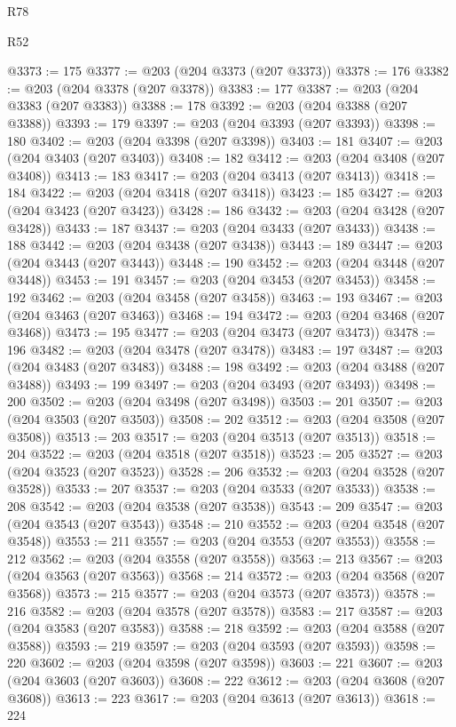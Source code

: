 \begin{lexlean}{R78}
\begin{lexlean}{R52}
\begin{coremodule}
{{{{{{{{{{{{{{{{{{{{{{{{{{{{{{{{{{{{{{{{{{{{{{{{{{{{{{{{{{{{{{{{{{{{{{{{{{{{{{{{{{{{{{{{{{{{{{{{{{{{{{{{{{{{{{{{{{{{{{{{{{{{{{{{{{{{{{{{{{{{{{{{{{{{{{{{{{{{{{{{{{{{{{{{{{{{{{{{{{{{{{{{{{{{{{{{{{{{{{@3373 := 175
@3377 := @203 (@204 @3373 (@207 @3373))
@3378 := 176
@3382 := @203 (@204 @3378 (@207 @3378))
@3383 := 177
@3387 := @203 (@204 @3383 (@207 @3383))
@3388 := 178
@3392 := @203 (@204 @3388 (@207 @3388))
@3393 := 179
@3397 := @203 (@204 @3393 (@207 @3393))
@3398 := 180
@3402 := @203 (@204 @3398 (@207 @3398))
@3403 := 181
@3407 := @203 (@204 @3403 (@207 @3403))
@3408 := 182
@3412 := @203 (@204 @3408 (@207 @3408))
@3413 := 183
@3417 := @203 (@204 @3413 (@207 @3413))
@3418 := 184
@3422 := @203 (@204 @3418 (@207 @3418))
@3423 := 185
@3427 := @203 (@204 @3423 (@207 @3423))
@3428 := 186
@3432 := @203 (@204 @3428 (@207 @3428))
@3433 := 187
@3437 := @203 (@204 @3433 (@207 @3433))
@3438 := 188
@3442 := @203 (@204 @3438 (@207 @3438))
@3443 := 189
@3447 := @203 (@204 @3443 (@207 @3443))
@3448 := 190
@3452 := @203 (@204 @3448 (@207 @3448))
@3453 := 191
@3457 := @203 (@204 @3453 (@207 @3453))
@3458 := 192
@3462 := @203 (@204 @3458 (@207 @3458))
@3463 := 193
@3467 := @203 (@204 @3463 (@207 @3463))
@3468 := 194
@3472 := @203 (@204 @3468 (@207 @3468))
@3473 := 195
@3477 := @203 (@204 @3473 (@207 @3473))
@3478 := 196
@3482 := @203 (@204 @3478 (@207 @3478))
@3483 := 197
@3487 := @203 (@204 @3483 (@207 @3483))
@3488 := 198
@3492 := @203 (@204 @3488 (@207 @3488))
@3493 := 199
@3497 := @203 (@204 @3493 (@207 @3493))
@3498 := 200
@3502 := @203 (@204 @3498 (@207 @3498))
@3503 := 201
@3507 := @203 (@204 @3503 (@207 @3503))
@3508 := 202
@3512 := @203 (@204 @3508 (@207 @3508))
@3513 := 203
@3517 := @203 (@204 @3513 (@207 @3513))
@3518 := 204
@3522 := @203 (@204 @3518 (@207 @3518))
@3523 := 205
@3527 := @203 (@204 @3523 (@207 @3523))
@3528 := 206
@3532 := @203 (@204 @3528 (@207 @3528))
@3533 := 207
@3537 := @203 (@204 @3533 (@207 @3533))
@3538 := 208
@3542 := @203 (@204 @3538 (@207 @3538))
@3543 := 209
@3547 := @203 (@204 @3543 (@207 @3543))
@3548 := 210
@3552 := @203 (@204 @3548 (@207 @3548))
@3553 := 211
@3557 := @203 (@204 @3553 (@207 @3553))
@3558 := 212
@3562 := @203 (@204 @3558 (@207 @3558))
@3563 := 213
@3567 := @203 (@204 @3563 (@207 @3563))
@3568 := 214
@3572 := @203 (@204 @3568 (@207 @3568))
@3573 := 215
@3577 := @203 (@204 @3573 (@207 @3573))
@3578 := 216
@3582 := @203 (@204 @3578 (@207 @3578))
@3583 := 217
@3587 := @203 (@204 @3583 (@207 @3583))
@3588 := 218
@3592 := @203 (@204 @3588 (@207 @3588))
@3593 := 219
@3597 := @203 (@204 @3593 (@207 @3593))
@3598 := 220
@3602 := @203 (@204 @3598 (@207 @3598))
@3603 := 221
@3607 := @203 (@204 @3603 (@207 @3603))
@3608 := 222
@3612 := @203 (@204 @3608 (@207 @3608))
@3613 := 223
@3617 := @203 (@204 @3613 (@207 @3613))
@3618 := 224
}}}}}}}}}}}}}}}}}}}}}}}}}}}}}}}}}}}}}}}}}}}}}}}}}}}}}}}}}}}}}}}}}}}}}}}}}}}}}}}}}}}}}}}}}}}}}}}}}}}}}}}}}}}}}}}}}}}}}}}}}}}}}}}}}}}}}}}}}}}}}}}}}}}}}}}}}}}}}}}}}}}}}}}}}}}}}}}}}}}}}}}}}}}}}}}}}}}}}}
\end{coremodule}
\end{lexlean}
\end{lexlean}
